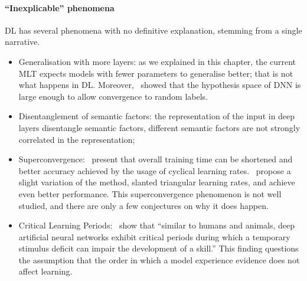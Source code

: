 \paragraph{``Inexplicable'' phenomena} \acf{DL} has several phenomena with no definitive explanation, stemming from a single narrative.
\begin{itemize}
	\item Generalisation with more layers: as we explained in this chapter, the current \acs{MLT} expects models with fewer parameters to generalise better; that is not what happens in \acs{DL}. Moreover,~\citeauthor{zhang:2016} showed that the hypothesis space of \acs{DNN} is large enough to allow convergence to random labels.
	\item Disentanglement of semantic factors: the representation of the input in deep layers disentangle semantic factors, \ie different semantic factors are not strongly correlated in the representation;
	\item Superconvergence:~\citeauthor{smith:2019} present that overall training time can be shortened and better accuracy achieved by the usage of cyclical learning rates.~\citeauthor{howard:2018universal} propose a slight variation of the method, slanted triangular learning rates, and achieve even better performance. This superconvergence phenomenon is not well studied, and there are only a few conjectures on why it does happen.
	\item Critical Learning Periods:~\citeauthor{achille:2018critical} show that ``similar to humans and animals, deep artificial neural networks exhibit critical periods during which a temporary stimulus deficit can impair the development of a skill.'' This finding questions the assumption that the order in which a model experience evidence does not affect learning.
\end{itemize}
